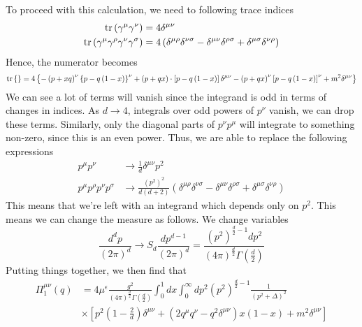 \documentclass[11pt, oneside]{article}   	%
\theoremstyle{slanted}
\begin{document}
To proceed with this 
calculation, we need to following 
trace indices
\begin{align*}
 \tr \left( \gamma ^{ \mu } \gamma ^{ \nu }  \right)  &=  4 \delta ^{ \mu \nu }  \\ 
 \tr \left( \gamma ^ \mu \gamma ^ \rho \gamma ^ \nu \gamma ^ \sigma  \right)  
						      &=  4 \left( \delta ^{ \mu \rho } \delta ^{ \nu \sigma } 
						      - \delta ^{ \mu \nu } \delta ^{ \rho \sigma } 
					      + \delta ^{ \mu \sigma } \delta ^{ \nu \rho } \right)  
\end{align*}
Hence, the numerator becomes 
\[
\tr \left\{   \right\}   = 4 \left\{  - \left(p + xq   \right)^{ \nu } 
\left\{  p - q \left( 1 - x   \right)   \right\}  ^{ \nu } 
+ \left( p + q x  \right)  \cdot  \left[  p - q \left( 1 -x  \right)    \right]  
\delta ^{ \mu \nu }  - \left( p + q x   \right)  ^{ \nu } \left[  
p - q \left( 1 - x  \right)   \right]  ^ \nu  + m ^ 2 \delta ^{ \mu \nu } \right\}  
\] 
We can see a lot of terms 
will vanish since the integrand is 
odd in terms of changes in indices. 
As $ d \to 4 $, integrals over odd powers 
of $ p ^{ \nu }  $ vanish, we can drop these 
terms. Similarly, only the diagonal parts of $ p ^ \nu p ^ \mu $  
will integrate to something non-zero, 
since this is an even power. Thus, we
are able to replace the following expressions 
\begin{align*}
p ^ \mu p ^ \nu & \to \frac{1}{ d } \delta ^{ \mu \nu  } p ^ 2 \\
p ^ \mu p ^ \rho p ^ \nu p ^ \sigma  & \to \frac{\left( p ^ 2  \right)  ^ 2  }{ d \left( d + 2  \right)   } 
\left( \delta ^{ \mu \rho } \delta ^{ \nu \sigma }  - \delta ^{ \mu \nu } \delta ^{ \rho \sigma } 
+ \delta ^{ \mu \sigma } \delta ^{ \nu \rho }  \right) 
\end{align*} 
This means 
that we're left with an integrand which depends only on 
$ p ^ 2 $. 
This means we can change the 
measure as follows. 
We change variables 
\[
\frac{d ^ d p  }{ \left( 2 \pi  \right)  ^{ d } } 
\to S _ d \frac{ d p ^{ d - 1  } }{ \left( 2 \pi  \right)  ^ d } 
= \frac{\left( p ^ 2  \right)  ^{ \frac{d}{2 }  - 1 }  d p ^ 2 }{ \left( 4 \pi  \right)  ^{ \frac{d}{2 }  } 
\Gamma \left( \frac{d}{2  }  \right) } 
\] Putting things together, 
we then find that 
\begin{align*}
\Pi _ 1 ^{ \mu \nu } \left( q  \right)  &=  4 \mu ^{ \epsilon } \frac{g ^ 2 }{ 
\left( 4 \pi  \right)  ^{ \frac{d}{2 } } \Gamma \left( \frac{d}{2  }  \right)    }
\int _ 0 ^ 1 dx \int _ 0 ^{ \infty } dp ^ 2 \left( p ^ 2   \right) ^{ \frac{d}{2 } -1  } \frac{1}{\left( 
p ^ 2 + \Delta \right)  ^ 2  } \\
					& \times 
					\left[  
					p ^2 \left( 1 - \frac{2}{d }   \right)  \delta ^{ \mu \nu } 
				+ 	 \left( 2 q ^ \mu q ^ \nu  - q ^ 2 \delta ^{ \mu \nu }  \right)  
			x \left( 1  - x  \right)  + m ^ 2 \delta ^{ \mu \nu } \right]  
\end{align*}
\end{document}
